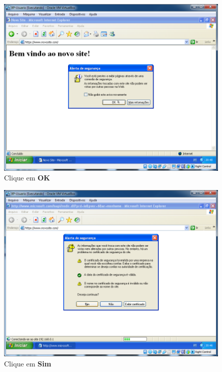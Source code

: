 \documentclass[10pt]{article}
\begin{document}
\begin{figure}[H]
    \centering
    \caption{Clique em \textbf{OK}}
    \label{fig:5532053}
    \includegraphics[width=\linewidth]{images/IIS/criando_um_novo_site/053.png}
\end{figure}
\begin{figure}[H]
    \centering
    \caption{Clique em \textbf{Sim}}
    \label{fig:5532056}
    \includegraphics[width=\linewidth]{images/IIS/criando_um_novo_site/056.png}
\end{figure}
\end{document}
